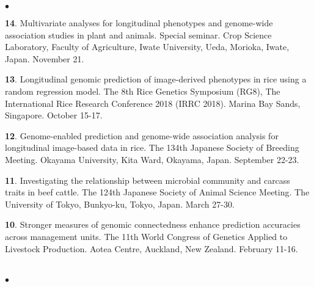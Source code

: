 \documentclass[margin,line,10pt]{res}
\newenvironment{list2}{
  \begin{list}{$\bullet$}{%
      \setlength{\itemsep}{0in}
      \setlength{\parsep}{0in} \setlength{\parskip}{0in}
      \setlength{\topsep}{0in} \setlength{\partopsep}{0in} 
      \setlength{\leftmargin}{0.2in}}}{\end{list}}
\begin{document}
\begin{resume}
\begin{list2}
  \vspace{0.5cm}
  
\item [{\bf 14}.] Multivariate analyses for longitudinal phenotypes and genome-wide association studies in plant and animals. Special seminar. Crop Science Laboratory, Faculty of Agriculture, Iwate University, Ueda, Morioka, Iwate, Japan. November 21.
  
  \vspace{0.5cm}

\item [{\bf 13}.] Longitudinal genomic prediction of image-derived phenotypes in rice using a random regression model. The 8th Rice Genetics Symposium (RG8), The International Rice Research Conference 2018 (IRRC 2018). Marina Bay Sands, Singapore. October 15-17.
  
  \vspace{0.5cm}
  
\item [{\bf 12}.] Genome-enabled prediction and genome-wide association analysis for longitudinal image-based data in rice. The 134th Japanese Society of Breeding Meeting. Okayama University, Kita Ward, Okayama, Japan. September 22-23.
  
  \vspace{0.5cm}

  
  \item [{\bf 11}.] Investigating the relationship between microbial community and carcass traits in beef cattle.  The 124th Japanese Society of Animal Science Meeting. The University of Tokyo, Bunkyo-ku, Tokyo, Japan. March 27-30.

    
    \vspace{0.5cm}

          
\item [{\bf 10}.] Stronger measures of genomic connectedness enhance prediction accuracies across management units. The 11th World Congress of Genetics Applied to Livestock Production.  Aotea Centre, Auckland, New Zealand. February 11-16. 

\end{list2}  





\section{}
\begin{list2}


\end{list2}
\end{resume}
\end{document}
